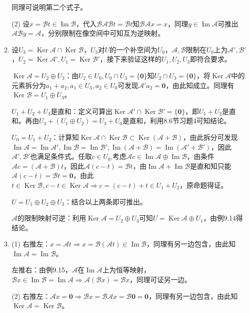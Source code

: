 \documentclass[a4paper,UTF8,fontset=windows]{ctexart}
\DeclareMathOperator{\im}{Im}
\DeclareMathOperator{\Ker}{Ker}
\begin{document}
\begin{enumerate}
同理可说明第二个式子。

(2)
设$x=\mathcal{B}t\in\im\mathcal{B}$，代入$\mathcal{B}\mathcal{A}\mathcal{B}t=\mathcal{B}t$知$\mathcal{B}\mathcal{A}x=x$，同理$y\in\im\mathcal{A}$可推出$\mathcal{A}\mathcal{B}y=\mathcal{A}$，分别限制在像空间中可知互为逆映射。

\item
设$U_3=\Ker\mathcal{A}\cap\Ker\mathcal{B}$，$U_3$对$U$的一个补空间为$U_0$，$\mathcal{A},\mathcal{B}$限制在$U_0$上为$\mathcal{A}',\mathcal{B}'$，$U_2=\Ker\mathcal{A}',U_1=\Ker\mathcal{B}'$，接下来验证这样的$U_1,U_2,U_3$即符合要求。

$\Ker\mathcal{A}=U_2\oplus U_3$：由$U_2\in U_0,U_0\cap U_3=\{\mathbf{0}\}$知$U_2\cap U_3=\{\mathbf{0}\}$，将$\Ker\mathcal{A}$中的元素拆分为$a_1+a_2,a_1\in U_3,a_2\in U_0$可发现$\mathcal{A}'a_2=\mathbf{0}$，由此知成立。同理有$\Ker\mathcal{B}=U_1\oplus U_3$。

$U_1+U_2+U_3$是直和：定义可算出$\Ker\mathcal{A}'\cap\Ker\mathcal{B}'=\{\mathbf{0}\}$，即$U_1+U_2$是直和。再由$U_3+(U_1\oplus U_2)=U_3+U_0$是直和，利用8.6节习题4可知结论。

$U_0=U_1+U_2$：计算知$\Ker\mathcal{A}\cap\Ker\mathcal{B}\subset\Ker(\mathcal{A}+\mathcal{B})$，由此拆分可发现$\im\mathcal{A}=\im\mathcal{A}',\im\mathcal{B}=\im\mathcal{B}',\im(\mathcal{A}+\mathcal{B})=\im(\mathcal{A}'+\mathcal{B}')$，因此$\mathcal{A}',\mathcal{B}'$也满足条件式。任取$c\in U_0$,考虑$\mathcal{A}c\in\im\mathcal{A}\oplus\im\mathcal{B}$，由条件$\mathcal{A}c=(\mathcal{A}+\mathcal{B})t$，因此$\mathcal{A}(c-t)=\mathcal{B}t$，由$\im\mathcal{A}+\im\mathcal{B}$是直和知只能$\mathcal{A}(c-t)=\mathcal{B}t=\mathbf{0}$，由此$t\in\Ker\mathcal{B},c-t\in\Ker\mathcal{A}\Rightarrow c=(c-t)+t\in U_1+U_2$，原命题得证。

$U=U_1\oplus U_2\oplus U_3$：结合以上两条即可推出。

$\mathcal{A}$的限制映射可逆：利用$\Ker\mathcal{A}=U_2\oplus U_3$可知$U=\Ker\mathcal{A}\oplus U_1$，由例9.14得结论。

\item
(1) 右推左：$x=\mathcal{A}t\Rightarrow x=\mathcal{B}(\mathcal{A}t)\in\im\mathcal{B}$，同理有另一边包含，由此知$\im\mathcal{A}=\im\mathcal{B}$。

左推右：由例9.15，$\mathcal{A}$在$\im\mathcal{A}$上为恒等映射，$\mathcal{B}x\in\im\mathcal{B}=\im\mathcal{A}\Rightarrow \mathcal{A}(\mathcal{B}x)=\mathcal{B}x$，同理可证另一边。

(2) 右推左：$\mathcal{A}x=\mathbf{0}\Rightarrow\mathcal{B}x=\mathcal{B}\mathcal{A}x=\mathcal{B}\mathbf{0}=\mathbf{0}$，同理有另一边包含，由此知$\Ker\mathcal{A}=\Ker\mathcal{B}$。


\end{enumerate}
\end{document}
